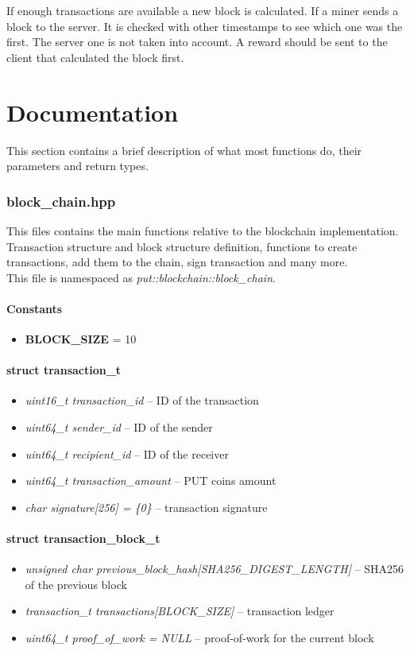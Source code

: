 \documentclass{article}
\begin{document}
If enough transactions are available a new block is calculated. If a miner sends a block to the server. It is checked with other timestamps to see which one was the first. The server one is not taken into account. A reward should be sent to the client that calculated the block first.


\newpage
\part{Documentation}\label{doc}
This section contains a brief description of what most functions do, their parameters and return types.

\section{block\_chain.hpp}
This files contains the main functions relative to the blockchain implementation. Transaction structure and block structure definition, functions to create transactions, add them to the chain, sign transaction and many more. \\

This file is namespaced as \textit{put::blockchain::block\_chain}.

\subsection{Constants}
\begin{itemize}
\item \textbf{BLOCK\_SIZE} = 10
\end{itemize}

\subsection{struct transaction\_t}
\begin{itemize}
\item \textit{uint16\_t transaction\_id} -- ID of the transaction
\item \textit{uint64\_t sender\_id} -- ID of the sender
\item \textit{uint64\_t recipient\_id} -- ID of the receiver
\item \textit{uint64\_t transaction\_amount} -- PUT coins amount
\item \textit{char signature[256] = \{0\}} -- transaction signature
\end{itemize}

\subsection{struct transaction\_block\_t}
\begin{itemize}
\item \textit{unsigned char previous\_block\_hash[SHA256\_DIGEST\_LENGTH]} -- SHA256 of the previous block
\item \textit{transaction\_t transactions[BLOCK\_SIZE]} -- transaction ledger
\item \textit{uint64\_t proof\_of\_work = NULL} -- proof-of-work for the current block
\end{itemize}
\end{document}
